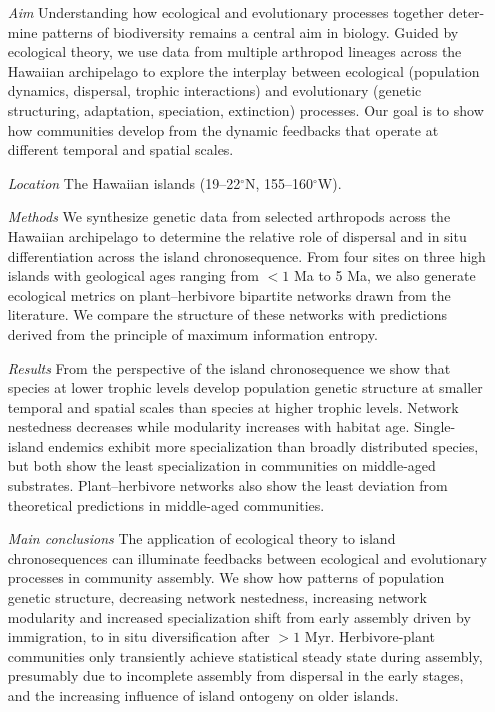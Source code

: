 \begin{itemize}
\item[\emph{Aim}] Understanding how ecological and evolutionary processes
  together deter- mine patterns of biodiversity remains a central aim
  in biology. Guided by ecological theory, we use data from multiple
  arthropod lineages across the Hawaiian archipelago to explore the
  interplay between ecological (population dynamics, dispersal,
  trophic interactions) and evolutionary (genetic structuring,
  adaptation, speciation, extinction) processes. Our goal is to show
  how communities develop from the dynamic feedbacks that operate at
  different temporal and spatial scales.
%
\item[\emph{Location}] The Hawaiian islands (19--22$^\circ$N, 155--160$^\circ$W).
%
\item[\emph{Methods}] We synthesize genetic data from selected
  arthropods across the Hawaiian archipelago to determine the
  relative role of dispersal and in situ differentiation across the
  island chronosequence. From four sites on three high islands with
  geological ages ranging from $< 1$ Ma to 5 Ma, we also generate
  ecological metrics on plant–herbivore bipartite networks drawn from
  the literature. We compare the structure of these networks with
  predictions derived from the principle of maximum information
  entropy.
%
\item[\emph{Results}] From the perspective of the island chronosequence we
  show that species at lower trophic levels develop population genetic
  structure at smaller temporal and spatial scales than species at
  higher trophic levels. Network nestedness decreases while modularity
  increases with habitat age. Single-island endemics exhibit more
  specialization than broadly distributed species, but both show the
  least specialization in communities on middle-aged
  substrates. Plant–herbivore networks also show the least deviation
  from theoretical predictions in middle-aged communities.
%
\item[\emph{Main conclusions}] The application of ecological theory to island
  chronosequences can illuminate feedbacks between ecological and
  evolutionary processes in community assembly. We show how patterns
  of population genetic structure, decreasing network nestedness,
  increasing network modularity and increased specialization shift
  from early assembly driven by immigration, to in situ
  diversification after $> 1$ Myr. Herbivore-plant communities only
  transiently achieve statistical steady state during assembly,
  presumably due to incomplete assembly from dispersal in the early
  stages, and the increasing influence of island ontogeny on older
  islands.
\end{itemize}

